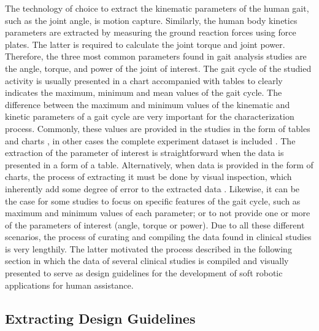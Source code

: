 The technology of choice to extract the kinematic parameters of the human gait, such as the joint angle, is motion capture. Similarly, the human body kinetics parameters are extracted by measuring the ground reaction forces using force plates. The latter is required to calculate the joint torque and joint power. Therefore, the three most common parameters found in gait analysis studies are the angle, torque, and power of the joint of interest. The gait cycle of the studied activity is usually presented in a chart accompanied with tables to clearly indicates the maximum, minimum and mean values of the gait cycle. The difference between the maximum and minimum values of the kinematic and kinetic parameters of a gait cycle are very important for the characterization process. Commonly, these values are provided in the studies in the form of tables and charts \cite{han2011biomechanical,yali2010biomechanics}, in other cases the complete experiment dataset is included \cite{moore2015elaborate}. The extraction of the parameter of interest is straightforward when the data is presented in a form of a table. Alternatively, when data is provided in the form of charts, the process of extracting it must be done by visual inspection, which inherently add some degree of error to the extracted data \cite{protopapadaki2007hip,riener2002stair,mcintosh2006gait,roebroeck1994biomechanics,mak2003joint}. Likewise, it can be the case for some studies to focus on specific features of the gait cycle, such as maximum and minimum values of each parameter; or to not provide one or more of the parameters of interest (angle, torque or power). Due to all these different scenarios, the process of curating and compiling the data found in clinical studies is very lengthily. The latter motivated the process described in the following section in which the data of several clinical studies is compiled and visually presented to serve as design guidelines for the development of soft robotic applications for human assistance.

\subsection{Extracting Design Guidelines}

